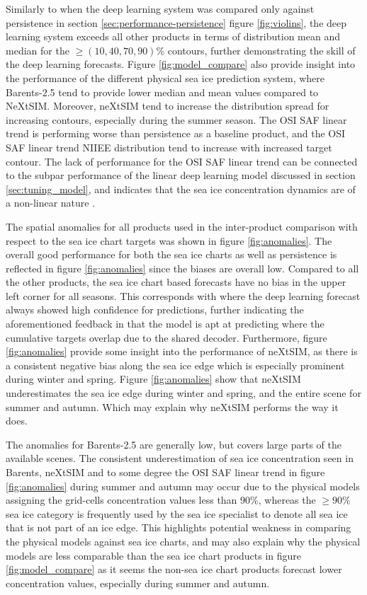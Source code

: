 \documentclass[../main/thesis]{subfiles}
\begin{document}
Similarly to when the deep learning system was compared only against persistence in section \ref{sec:performance-persistence} figure \ref{fig:violins}, the deep learning system exceeds all other products in terms of distribution mean and median for the $\geq(10, 40, 70, 90)\%$ contours, further demonstrating the skill of the deep learning forecasts. Figure \ref{fig:model_compare} also provide insight into the performance of the different physical sea ice prediction system, where Barents-2.5 tend to provide lower median and mean values compared to NeXtSIM. Moreover, neXtSIM tend to increase the distribution spread for increasing contours, especially during the summer season. The OSI SAF linear trend is performing worse than persistence as a baseline product, and the OSI SAF linear trend NIIEE distribution tend to increase with increased target contour. The lack of performance for the OSI SAF linear trend can be connected to the subpar performance of the linear deep learning model discussed in section \ref{sec:tuning_model}, and indicates that the sea ice concentration dynamics are of a non-linear nature \citep{Grigoryev2022}.

The spatial anomalies for all products used in the inter-product comparison with respect to the sea ice chart targets was shown in figure \ref{fig:anomalies}. The overall good performance for both the sea ice charts as well as persistence is reflected in figure \ref{fig:anomalies} since the biases are overall low. Compared to all the other products, the sea ice chart based forecasts have no bias in the upper left corner for all seasons. This corresponds with where the deep learning forecast always showed high confidence for predictions, further indicating the aforementioned feedback in that the model is apt at predicting where the cumulative targets overlap due to the shared decoder. Furthermore, figure \ref{fig:anomalies} provide some insight into the performance of neXtSIM, as there is a consistent negative bias along the sea ice edge which is especially prominent during winter and spring. Figure \ref{fig:anomalies} show that neXtSIM underestimates the sea ice edge during winter and spring, and the entire scene for summer and autumn. Which may explain why neXtSIM performs the way it does.

The anomalies for Barents-2.5 are generally low, but covers large parts of the available scenes. The consistent underestimation of sea ice concentration seen in Barents, neXtSIM and to some degree the OSI SAF linear trend in figure \ref{fig:anomalies} during summer and autumn may occur due to the physical models assigning the grid-cells concentration values less than 90\%, whereas the $\geq90\%$ sea ice category is frequently used by the sea ice specialist to denote all sea ice that is not part of an ice edge. This highlights potential weakness in comparing the physical models against sea ice charts, and may also explain why the physical models are less comparable than the sea ice chart products in figure \ref{fig:model_compare} as it seems the non-sea ice chart products forecast lower concentration values, especially during summer and autumn.
\end{document}
